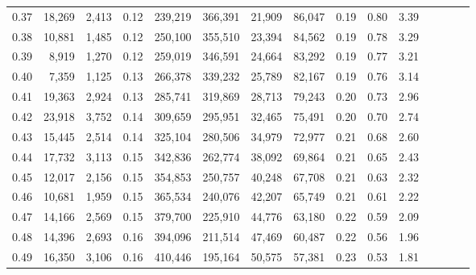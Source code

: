 \begin{tabular}{rrrcrrrrrrrrrrr}
0.37 &  18,269 &  2,413 &                                       0.12 &  239,219 &  366,391 &   21,909 &   86,047 &  0.19 &  0.80 &                         3.39 \\
0.38 &  10,881 &  1,485 &                                       0.12 &  250,100 &  355,510 &   23,394 &   84,562 &  0.19 &  0.78 &                         3.29 \\
0.39 &   8,919 &  1,270 &                                       0.12 &  259,019 &  346,591 &   24,664 &   83,292 &  0.19 &  0.77 &                         3.21 \\
0.40 &   7,359 &  1,125 &                                       0.13 &  266,378 &  339,232 &   25,789 &   82,167 &  0.19 &  0.76 &                         3.14 \\
0.41 &  19,363 &  2,924 &                                       0.13 &  285,741 &  319,869 &   28,713 &   79,243 &  0.20 &  0.73 &                         2.96 \\
0.42 &  23,918 &  3,752 &                                       0.14 &  309,659 &  295,951 &   32,465 &   75,491 &  0.20 &  0.70 &                         2.74 \\
0.43 &  15,445 &  2,514 &                                       0.14 &  325,104 &  280,506 &   34,979 &   72,977 &  0.21 &  0.68 &                         2.60 \\
0.44 &  17,732 &  3,113 &                                       0.15 &  342,836 &  262,774 &   38,092 &   69,864 &  0.21 &  0.65 &                         2.43 \\
0.45 &  12,017 &  2,156 &                                       0.15 &  354,853 &  250,757 &   40,248 &   67,708 &  0.21 &  0.63 &                         2.32 \\
0.46 &  10,681 &  1,959 &                                       0.15 &  365,534 &  240,076 &   42,207 &   65,749 &  0.21 &  0.61 &                         2.22 \\
0.47 &  14,166 &  2,569 &                                       0.15 &  379,700 &  225,910 &   44,776 &   63,180 &  0.22 &  0.59 &                         2.09 \\
0.48 &  14,396 &  2,693 &                                       0.16 &  394,096 &  211,514 &   47,469 &   60,487 &  0.22 &  0.56 &                         1.96 \\
0.49 &  16,350 &  3,106 &                                       0.16 &  410,446 &  195,164 &   50,575 &   57,381 &  0.23 &  0.53 &                         1.81 \\

\end{tabular}
